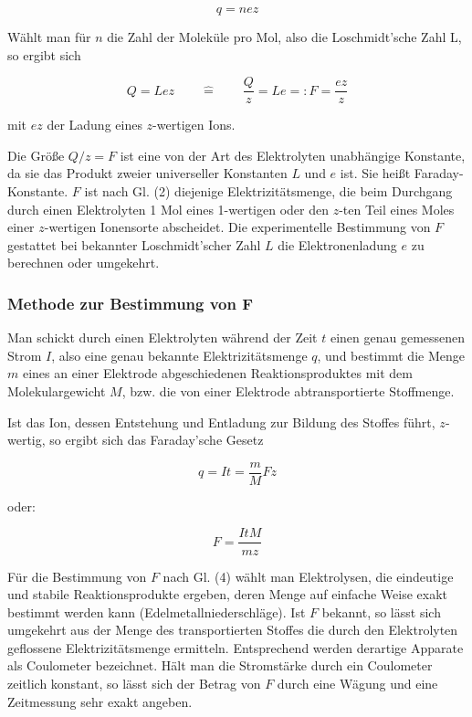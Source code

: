 \documentclass[11pt,ngerman]{scrartcl}
\begin{document}
\begin{equation}
	q = n e z
\end{equation}

Wählt man für $n$ die Zahl der Moleküle pro Mol, also die Loschmidt'sche Zahl L, so ergibt sich

\begin{equation}
	Q = L e z \qquad \hat{=} \qquad \frac{Q}{z} = L e =: F = \frac{e z}{z}
\end{equation}

mit $e z$ der Ladung eines $z$-wertigen Ions.

Die Größe $Q/z = F$ ist eine von der Art des Elektrolyten unabhängige Konstante, da sie das
Produkt zweier universeller Konstanten $L$ und $e$ ist. Sie heißt Faraday-Konstante. $F$ ist nach
Gl. (2) diejenige Elektrizitätsmenge, die beim Durchgang durch einen Elektrolyten 1 Mol eines
1-wertigen oder den $z$-ten Teil eines Moles einer $z$-wertigen Ionensorte abscheidet. Die experimentelle
Bestimmung von $F$ gestattet bei bekannter Loschmidt'scher Zahl $L$ die Elektronenladung
$e$ zu berechnen oder umgekehrt.

\subsubsection{Methode zur Bestimmung von F}

Man schickt durch einen Elektrolyten während der Zeit $t$ einen genau gemessenen Strom $I$, also
eine genau bekannte Elektrizitätsmenge $q$, und bestimmt die Menge $m$ eines an einer Elektrode
abgeschiedenen Reaktionsproduktes mit dem Molekulargewicht $M$, bzw. die von einer Elektrode
abtransportierte Stoffmenge.

Ist das Ion, dessen Entstehung und Entladung zur Bildung des Stoffes führt, $z$-wertig, so ergibt
sich das Faraday'sche Gesetz

\begin{equation}
	q = I t = \frac{m}{M} F z
\end{equation}

oder:

\begin{equation}
	F = \frac{I t M}{m z}
	\label{eq:Faraday_silber}
\end{equation}

Für die Bestimmung von $F$ nach Gl. (4) wählt man Elektrolysen, die eindeutige und stabile
Reaktionsprodukte ergeben, deren Menge auf einfache Weise exakt bestimmt werden kann
(Edelmetallniederschläge). Ist $F$ bekannt, so lässt sich umgekehrt aus der Menge des transportierten
Stoffes die durch den Elektrolyten geflossene Elektrizitätsmenge ermitteln. Entsprechend
werden derartige Apparate als Coulometer bezeichnet. Hält man die Stromstärke durch ein Coulometer
zeitlich konstant, so lässt sich der Betrag von $F$ durch eine Wägung und eine Zeitmessung
sehr exakt angeben.
\end{document}

